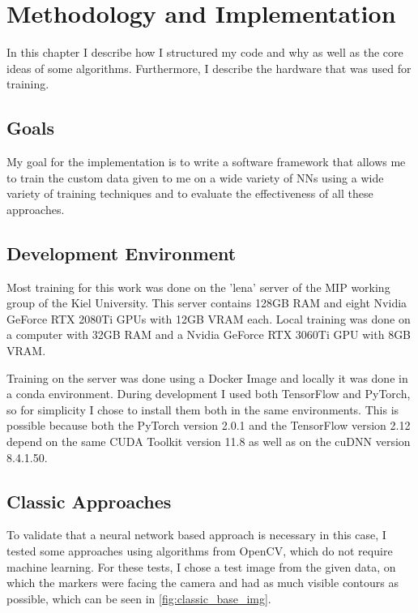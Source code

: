 \documentclass[10pt]{book}
\begin{document}
\chapter{Methodology and Implementation}
\label{chap:implement}

In this chapter I describe how I structured my code and why as well as the core ideas of some algorithms. Furthermore, I describe the hardware that was used for training.

\section{Goals}


My goal for the implementation is to write a software framework that allows me to train the custom data given to me on a wide variety of \acp{NN} using a wide variety of training techniques and to evaluate the effectiveness of all these approaches.

\section{Development Environment}

Most training for this work was done on the 'lena' server of the \ac{MIP} working group of the Kiel University. This server contains 128GB RAM and eight Nvidia GeForce RTX 2080Ti \acp{GPU} with 12GB VRAM each. Local training was done on a computer with 32GB RAM and a Nvidia GeForce RTX 3060Ti \ac{GPU} with 8GB VRAM.

Training on the server was done using a Docker Image and locally it was done in a conda environment. During development I used both TensorFlow and PyTorch, so for simplicity I chose to install them both in the same environments. This is possible because both the PyTorch version 2.0.1 and the TensorFlow version 2.12 depend on the same \ac{CUDA} Toolkit version 11.8 as well as on the \ac{cuDNN} version 8.4.1.50.

\section{Classic Approaches}

To validate that a neural network based approach is necessary in this case, I tested some approaches using algorithms from \ac{OpenCV}, which do not require machine learning. For these tests, I chose a test image from the given data, on which the markers were facing the camera and had as much visible contours as possible, which can be seen in \autoref{fig:classic_base_img}. 
\end{document}
